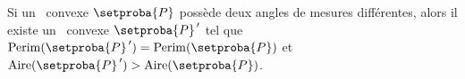 %
%
%
%
%
%
\begin{fact} \label{almost-reg-poly}
	Si un \nequi\ convexe $\setproba{P}$ possède deux angles de mesures différentes,
	alors il existe un \ngone\ convexe $\setproba{P}^{\,\prime}$ tel que
	$\perim{\setproba{P}^{\,\prime}} = \perim{\setproba{P}}$
	et
	$\area{\setproba{P}^{\,\prime}} > \area{\setproba{P}}$.
\end{fact}


